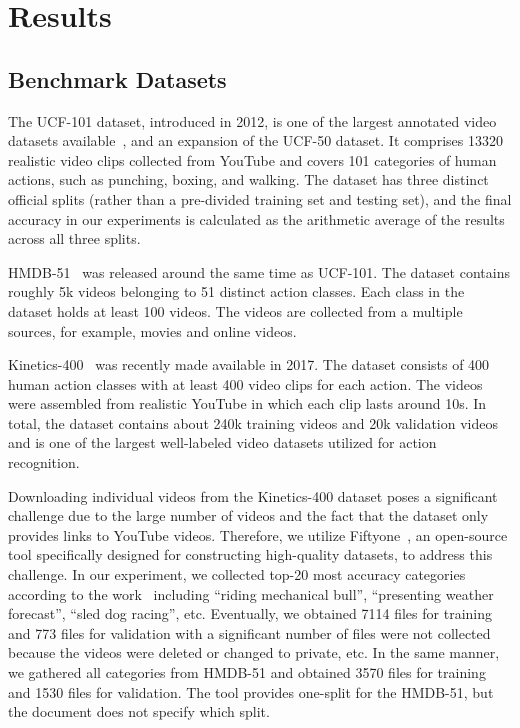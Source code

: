 \documentclass[fleqn,10pt]{wlscirep}
\begin{document}
\section{Results}
\label{sec:results}
\subsection{Benchmark Datasets}
\label{sec:dataset}



The UCF-101 dataset, introduced in 2012, is one of the largest annotated video datasets available~\cite{soomro2012ucf101}, and an expansion of the UCF-50 dataset. It comprises 13320 realistic video clips collected from YouTube and covers 101 categories of human actions, such as punching, boxing, and walking. The dataset has three distinct official splits (rather than a pre-divided training set and testing set), and the final accuracy in our experiments is calculated as the arithmetic average of the results across all three splits. 

HMDB-51~\cite{kuehne2011hmdb} was released around the same time as UCF-101. The dataset contains roughly 5k videos belonging to 51 distinct action classes. Each class in the dataset holds at least 100 videos. The videos are collected from a multiple sources, for example, movies and online videos.

Kinetics-400~\cite{kay2017kinetics} was recently made available in 2017. The dataset consists of 400 human action classes with at least 400 video clips for each action. The videos were assembled from realistic YouTube in which each clip lasts around 10s. In total, the dataset contains about 240k training videos and 20k validation videos and is one of the largest well-labeled video datasets utilized for action recognition.

Downloading individual videos from the Kinetics-400 dataset poses a significant challenge due to the large number of videos and the fact that the dataset only provides links to YouTube videos. Therefore, we utilize Fiftyone~\cite{fiftyone23}, an open-source tool specifically designed for constructing high-quality datasets, to address this challenge. In our experiment, we collected top-20 most accuracy categories according to the work~\cite{kay2017kinetics} including ``riding mechanical bull'', ``presenting weather forecast'', ``sled dog racing'', etc. Eventually, we obtained 7114 files for training and 773 files for validation with a significant number of files were not collected because the videos were deleted or changed to private, etc. In the same manner, we gathered all categories from HMDB-51 and obtained 3570 files for training and 1530 files for validation. The tool provides one-split for the HMDB-51, but the document does not specify which split.\\
\end{document}
